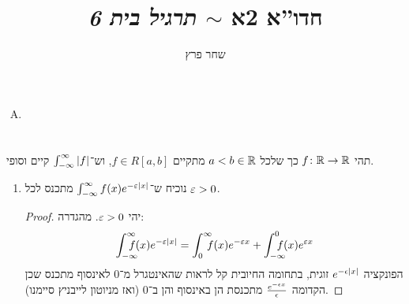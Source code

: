 \documentclass[]{../../../../tex/classes/homework}
\author{שחר פרץ}
\title{חדו''א 2א $\sim$ \textit{תרגיל בית 6}}
\begin{document}
	\maketitle
	\section{}
	\begin{enumerate}[(A)]
		\item 
	\end{enumerate}
	
	\section{}
	תהי $f \colon \mathbb{R} \to \mathbb{R}$ כך שלכל $a < b \in \mathbb{R}$ מתקיים $f \in R[a, b]$, וש־$\int_{-\infty}^{\infty} \left \lvert f \right \rvert$ קיים וסופי. 
	\begin{enumerate}
		\item נוכיח ש־$\int^{\infty}_{-\infty}f(x)e^{-\eg \sof x}$ מתכנס לכל $\eg > 0$. 
		\begin{proof}
			יהי $\eg > 0$. מהגדרה: 
			\[ \int^{\infty}_{-\infty}\dequad f(x)e^{-\eg \sof x} = \int_0^{\infty}\dequad \ f(x)e^{-\eg x} + \int_{-\infty}^{0}\dequad f(x)e^{\eg x} \]
			הפונקציה $e^{-\epsilon \left \lvert x \right \rvert}$ זוגית, בתחומה החיובית קל לראות שהאינטגרל מ־$0$ לאינסוף מתכנס שכן הקדומה $\frac{e^{-\epsilon x}}{\epsilon}$ מתכנסת הן באינסוף והן ב־$0$ (ואז מניוטון לייבניץ סיימנו). 
		\end{proof}
	\end{enumerate}
	
	\ndoc
\end{document}
